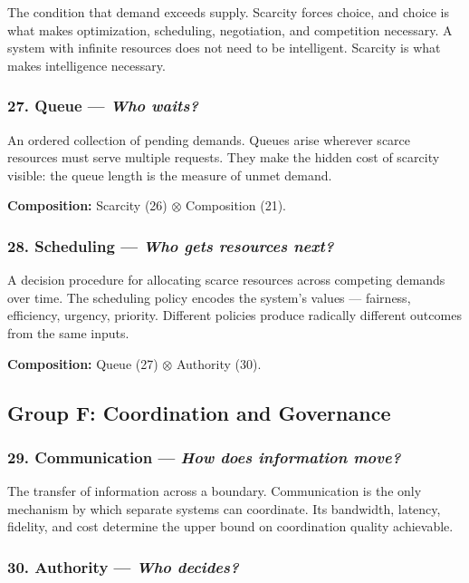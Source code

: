 \documentclass[11pt,a4paper]{article}
\newcommand{\question}[1]{\textit{#1}}
\newcommand{\comp}{\mathbin{\otimes}}
\begin{document}
The condition that demand exceeds supply. Scarcity forces choice, and choice is what makes optimization, scheduling, negotiation, and competition necessary. A system with infinite resources does not need to be intelligent. Scarcity is what makes intelligence necessary.

\subsubsection{27. Queue --- \question{Who waits?}}

An ordered collection of pending demands. Queues arise wherever scarce resources must serve multiple requests. They make the hidden cost of scarcity visible: the queue length is the measure of unmet demand.

\textbf{Composition:} Scarcity (26) $\comp$ Composition (21).

\subsubsection{28. Scheduling --- \question{Who gets resources next?}}

A decision procedure for allocating scarce resources across competing demands over time. The scheduling policy encodes the system's values --- fairness, efficiency, urgency, priority. Different policies produce radically different outcomes from the same inputs.

\textbf{Composition:} Queue (27) $\comp$ Authority (30).

\subsection{Group F: Coordination and Governance}

\subsubsection{29. Communication --- \question{How does information move?}}

The transfer of information across a boundary. Communication is the only mechanism by which separate systems can coordinate. Its bandwidth, latency, fidelity, and cost determine the upper bound on coordination quality achievable.

\subsubsection{30. Authority --- \question{Who decides?}}
\end{document}
